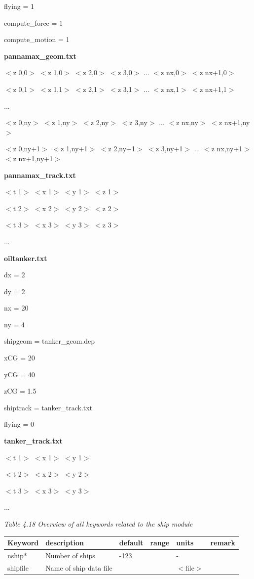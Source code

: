 \documentclass{article}
\begin{document}
\noindent flying = 1

\noindent compute\_force = 1

\noindent compute\_motion = 1

\noindent \textbf{pannamax\_geom.txt}

\noindent $<$z 0,0$>$ $<$z 1,0$>$ $<$z 2,0$>$ $<$z 3,0$>$ ... $<$z nx,0$>$ $<$z nx+1,0$>$

\noindent $<$z 0,1$>$ $<$z 1,1$>$ $<$z 2,1$>$ $<$z 3,1$>$ ... $<$z nx,1$>$ $<$z nx+1,1$>$

\noindent ...

\noindent $<$z 0,ny$>$ $<$z 1,ny$>$ $<$z 2,ny$>$ $<$z 3,ny$>$ ... $<$z nx,ny$>$ $<$z nx+1,ny$>$

\noindent $<$z 0,ny+1$>$ $<$z 1,ny+1$>$ $<$z 2,ny+1$>$ $<$z 3,ny+1$>$ ... $<$z nx,ny+1$>$ $<$z nx+1,ny+1$>$

\noindent \textbf{pannamax\_track.txt}

\noindent $<$t 1$>$ $<$x 1$>$ $<$y 1$>$ $<$z 1$>$

\noindent $<$t 2$>$ $<$x 2$>$ $<$y 2$>$ $<$z 2$>$

\noindent $<$t 3$>$ $<$x 3$>$ $<$y 3$>$ $<$z 3$>$

\noindent ...

\noindent \textbf{oiltanker.txt}

\noindent dx = 2

\noindent dy = 2

\noindent nx = 20

\noindent ny = 4

\noindent shipgeom = tanker\_geom.dep

\noindent xCG = 20

\noindent yCG = 40

\noindent zCG = 1.5

\noindent shiptrack = tanker\_track.txt

\noindent flying = 0

\noindent \textbf{tanker\_track.txt}

\noindent $<$t 1$>$ $<$x 1$>$ $<$y 1$>$

\noindent $<$t 2$>$ $<$x 2$>$ $<$y 2$>$

\noindent $<$t 3$>$ $<$x 3$>$ $<$y 3$>$

\noindent ...

\noindent \textit{Table 4.18 Overview of all keywords related to the ship module}

\begin{tabular}{|p{0.7in}|p{1.1in}|p{0.6in}|p{0.7in}|p{0.5in}|p{0.6in}|} \hline 
Keyword & description & default & range & units & remark \\ \hline 
nship* & Number of ships & -123 &  & - &  \\ \hline 
shipfile & Name of ship data file &  &  & $<$file$>$ &  \\ \hline 
\end{tabular}
\end{document}
